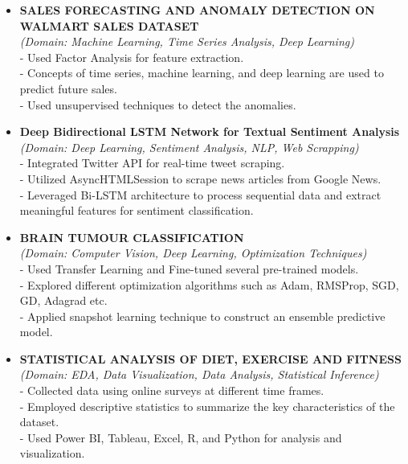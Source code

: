 \documentclass[11pt,a4paper,sans]{moderncv}
\begin{document}
{\begin{itemize}[label=\textbullet]
\item {
\textbf{SALES FORECASTING AND ANOMALY DETECTION ON WALMART SALES DATASET} \href{https://github.com/U77w41/Forcasting-and-Anomaly-Detection}{}\\ 
\textit{(Domain: Machine Learning, Time Series Analysis, Deep Learning)} }
\\- Used Factor Analysis for feature extraction.
\\- Concepts of time series, machine learning, and deep learning are used to predict future sales.
\\- Used unsupervised techniques to detect the anomalies.
\end{itemize}}
%
{\begin{itemize}[label=\textbullet]
\item {
\textbf{Deep Bidirectional LSTM Network for Textual Sentiment Analysis} \href{https://github.com/U77w41/Deep-Bidirectional-LSTM-Network-for-Textual-Sentiment-Analysis}{}\\ 
\textit{(Domain: Deep Learning, Sentiment Analysis, NLP, Web Scrapping)} }
\\- Integrated Twitter API for real-time tweet scraping.
\\- Utilized AsyncHTMLSession to scrape news articles from Google News.
\\- Leveraged Bi-LSTM architecture to process sequential data and extract meaningful features for sentiment classification.
\end{itemize}}
%
{\begin{itemize}[label=\textbullet]
\item {
\textbf{BRAIN TUMOUR CLASSIFICATION} \href{https://github.com/U77w41/Brain-Tumour-Classificaion}{}\\ 
\textit{(Domain: Computer Vision, Deep Learning, Optimization Techniques)} }
\\- Used Transfer Learning and Fine-tuned several pre-trained models.
\\- Explored different optimization algorithms such as Adam, RMSProp, SGD, GD, Adagrad etc.
\\- Applied snapshot learning technique to construct an ensemble predictive model.
\end{itemize}}
%
{\begin{itemize}[label=\textbullet]
\item {
\textbf{STATISTICAL ANALYSIS OF DIET, EXERCISE AND FITNESS} \href{https://github.com/U77w41/PDS-Project}{}\\ 
\textit{(Domain: EDA, Data Visualization, Data Analysis, Statistical Inference)} }
\\- Collected data using online surveys at different time frames.
\\- Employed descriptive statistics to summarize the key characteristics of the dataset.
\\- Used Power BI, Tableau, Excel, R, and Python for analysis and visualization.
\end{itemize}}
\end{document}
